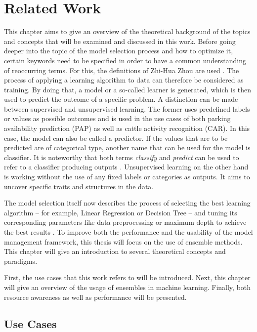 \chapter{Related Work} \label{chap:relatedwork}

This chapter aims to give an overview of the theoretical background of the topics and concepts that will be examined and discussed in this work. Before going deeper into the topic of the model selection process and how to optimize it, certain keywords need to be specified in order to have a common understanding of reoccurring terms. For this, the definitions of Zhi-Hua Zhou are used \cite{zhou2012}. The process of applying a learning algorithm to data can therefore be considered as training. By doing that, a model or a so-called learner is generated, which is then used to predict the outcome of a specific problem. A distinction can be made between supervised and unsupervised learning. The former uses predefined labels or values as possible outcomes and is used in the use cases of both parking availability prediction (PAP) as well as cattle activity recognition (CAR). In this case, the model can also be called a predictor. If the values that are to be predicted are of categorical type, another name that can be used for the model is classifier. It is noteworthy that both terms \textit{classify} and \textit{predict} can be used to refer to a classifier producing outputs \cite{james2023}. Unsupervised learning on the other hand is working without the use of any fixed labels or categories as outputs. It aims to uncover specific traits and structures in the data.

The model selection itself now describes the process of selecting the best learning algorithm – for example, Linear Regression or Decision Tree – and tuning its corresponding parameters like data preprocessing or maximum depth to achieve the best results \cite{zhou2012}. To improve both the performance and the usability of the model management framework, this thesis will focus on the use of ensemble methods. This chapter will give an introduction to several theoretical concepts and paradigms. 

First, the use cases that this work refers to will be introduced. Next, this chapter will give an overview of the usage of ensembles in machine learning. Finally, both resource awareness as well as performance will be presented.





\section{Use Cases}\label{usecases}

